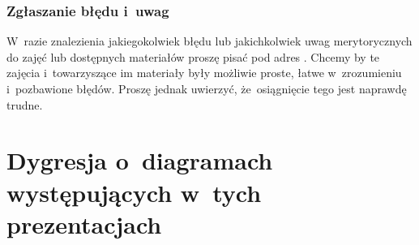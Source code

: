 \documentclass[10pt,t]{beamer}
\begin{document}
\begin{frame}
  \frametitle{Zgłaszanie błędu i~uwag}


  W~razie znalezienia jakiegokolwiek błędu lub jakichkolwiek uwag
  merytorycznych do zajęć lub dostępnych materiałów proszę pisać pod adres
  \email. Chcemy by te zajęcia i~towarzyszące im materiały były możliwie
  proste, łatwe w~zrozumieniu i~pozbawione błędów. Proszę jednak uwierzyć,
  że~osiągnięcie tego jest naprawdę trudne.

\end{frame}










\section{Dygresja o~diagramach występujących w~tych
  prezentacjach}
\end{document}
